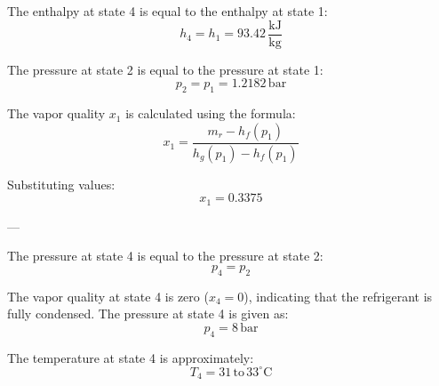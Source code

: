 The enthalpy at state 4 is equal to the enthalpy at state 1:  
\[
h_4 = h_1 = 93.42 \, \frac{\text{kJ}}{\text{kg}}
\]  

The pressure at state 2 is equal to the pressure at state 1:  
\[
p_2 = p_1 = 1.2182 \, \text{bar}
\]  

The vapor quality \( x_1 \) is calculated using the formula:  
\[
x_1 = \frac{m_r - h_f(p_1)}{h_g(p_1) - h_f(p_1)}
\]  

Substituting values:  
\[
x_1 = 0.3375
\]  

---

The pressure at state 4 is equal to the pressure at state 2:  
\[
p_4 = p_2
\]  

The vapor quality at state 4 is zero (\( x_4 = 0 \)), indicating that the refrigerant is fully condensed. The pressure at state 4 is given as:  
\[
p_4 = 8 \, \text{bar}
\]  

The temperature at state 4 is approximately:  
\[
T_4 = 31 \, \text{to} \, 33^\circ\text{C}
\]